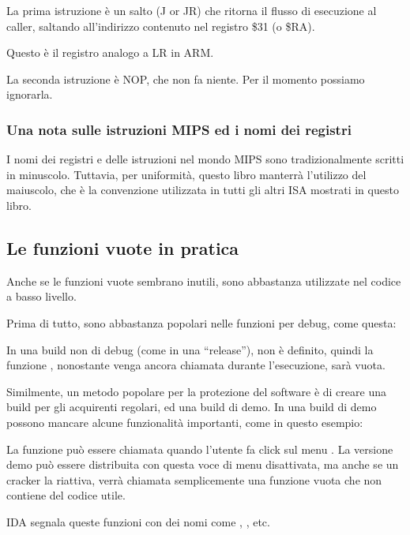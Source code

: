 La prima istruzione è un salto (J or JR) che ritorna il flusso di esecuzione al \gls{caller},
saltando all'indirizzo contenuto nel registro \$31 (o \$RA).

Questo è il registro analogo a \ac{LR} in ARM.

La seconda istruzione è \ac{NOP}, che non fa niente.
Per il momento possiamo ignorarla.

\subsubsection{Una nota sulle istruzioni MIPS ed i nomi dei registri}

I nomi dei registri e delle istruzioni nel mondo MIPS sono tradizionalmente scritti in minuscolo.
Tuttavia, per uniformità, questo libro manterrà l'utilizzo del maiuscolo,
che è la convenzione utilizzata in tutti gli altri \ac{ISA} mostrati in questo libro.

\subsection{Le funzioni vuote in pratica}

Anche se le funzioni vuote sembrano inutili, sono abbastanza utilizzate nel codice a basso livello.

Prima di tutto, sono abbastanza popolari nelle funzioni per debug, come questa:



In una build non di debug (come in una ``release''),  non è definito,
quindi la funzione , nonostante venga ancora chiamata durante l'esecuzione,
sarà vuota.

Similmente, un metodo popolare per la protezione del software è di creare una build per gli acquirenti regolari, ed una build di demo.
In una build di demo possono mancare alcune funzionalità importanti, come in questo esempio:



La funzione  può essere chiamata quando l'utente fa click sul menu .
La versione demo può essere distribuita con questa voce di menu disattivata, ma anche se un cracker la riattiva,
verrà chiamata semplicemente una funzione vuota che non contiene del codice utile.

IDA segnala queste funzioni con dei nomi come , , etc.

